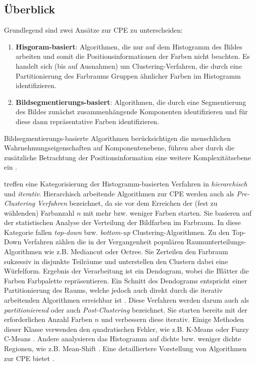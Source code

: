 \documentclass[11pt,a4paper,bibliography=totoc,twocolumn]{scrartcl}
\begin{document}
\subsection{Überblick}

Grundlegend sind zwei Ansätze zur CPE zu unterscheiden:
\begin{enumerate}
    \item \textbf{Hisgoram-basiert}: Algorithmen, die nur auf dem Histogramm des Bildes arbeiten und somit die Positionsinformationen der Farben nicht beachten. Es handelt sich (bis auf Ausnahmen) um Clustering-Verfahren, die durch eine Partitionierung des Farbraums Gruppen ähnlicher Farben im Histogramm identifizieren.
    \item \textbf{Bildsegmentierungs-basiert}: Algorithmen, die durch eine Segmentierung des Bildes zunächst zusammenhängende Komponenten identifizieren und für diese dann repräsentative Farben identifizieren.
\end{enumerate}


Bildsegmentierungs-basierte Algorithmen berücksichtigen die menschlichen Wahrnehmungseigenschaften auf Komponentenebene, führen aber durch die zusätzliche Betrachtung der Positionsinformation eine weitere Komplexitätsebene ein \citep{colorthemes}.

\citet{categorization} treffen eine Kategorisierung der Histogramm-basierten Verfahren in \emph{hierarchisch} und \emph{iterativ}. Hierarchisch arbeitende Algorithmen zur CPE werden auch als \emph{Pre-Clustering Verfahren} bezeichnet, da sie vor dem Erreichen der (fest zu wählenden) Farbanzahl $n$ mit mehr bzw. weniger Farben starten. Sie basieren auf der statistischen Analyse der Verteilung der Bildfarben im Farbraum. In diese Kategorie fallen \emph{top-down} bzw. \emph{bottom-up} Clustering-Algorithmen. Zu den Top-Down Verfahren zählen die in der Vergangenheit populären Raumunterteilungs-Algorithmen wie z.B. Mediancut \citep{mediancut} oder Octree\citep{octree}. Sie Zerteilen den Farbraum sukzessiv in disjunkte Teilräume und unterstellen den Clustern dabei eine Würfelform. Ergebnis der Verarbeitung ist ein Dendogram, wobei die Blätter die Farben Farbpalette repräsentieren. Ein Schnitt des Dendograms entspricht einer Partitionierung des Raums, welche jedoch auch direkt durch die iterativ arbeitenden Algorithmen erreichbar ist \citep{acopa}. Diese Verfahren werden darum auch als \emph{partitionierend} \citep{acopa} oder auch \emph{Post-Clustering} \citep{categorization} bezeichnet. Sie starten bereits mit der erforderlichen Anzahl Farben $n$ und verbessern diese iterativ. Einige Methoden dieser Klasse verwenden den quadratischen Fehler, wie z.B. K-Means \citep{kmeans, kmeanshsi} oder Fuzzy C-Means \citep{fuccycmeans}. Andere analysieren das Histogramm auf dichte bzw. weniger dichte Regionen, wie z.B. Mean-Shift \citep{meanshift}. Eine detailliertere Vorstellung von Algorithmen zur CPE bietet \citep{categorization2}.
\end{document}
